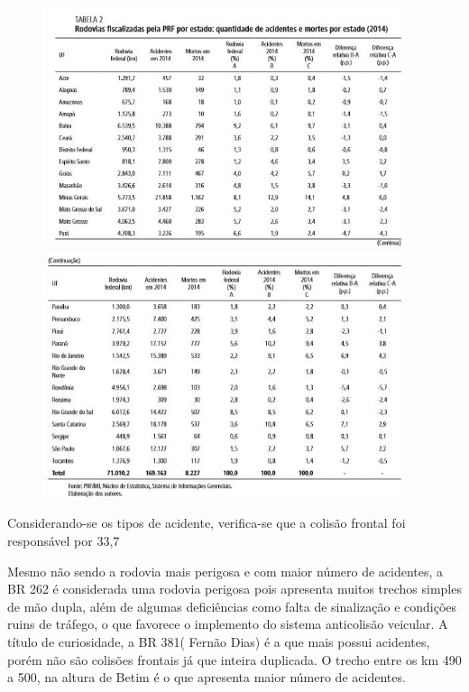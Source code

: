 \begin{enumerate}
\begin{figure}[h]
  \centering
  \includegraphics[width=400px, scale=0.5]{figuras/table1}
  \includegraphics[width=400px, scale=0.5]{figuras/table2}
  \label{table:table}
\end{figure}

Considerando-se os tipos de acidente, verifica-se que a colisão frontal foi responsável por 33,7%

Mesmo não sendo a rodovia mais perigosa e com maior número de acidentes, a BR 262 é considerada uma rodovia perigosa pois apresenta muitos trechos simples de mão dupla, além de algumas deficiências como falta de sinalização e condições ruins de tráfego, o que favorece o implemento do sistema anticolisão veicular. A título de curiosidade, a BR 381( Fernão Dias) é a que mais possui acidentes, porém não são colisões frontais já que inteira duplicada. O trecho entre os km 490 a 500, na altura de Betim é o que apresenta maior número de acidentes.


\end{enumerate}
